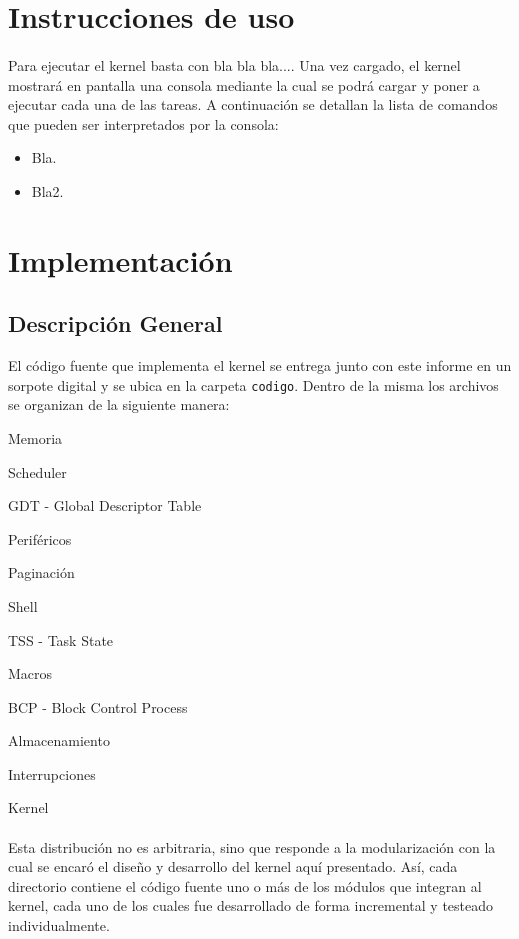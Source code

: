 \documentclass[11pt, a4paper]{article}
\begin{document}
		
\section{Instrucciones de uso}
\paragraph{}
Para ejecutar el kernel basta con bla bla bla.... Una vez cargado, el kernel mostrará en pantalla una consola mediante la cual se podrá cargar y poner a ejecutar cada una de las tareas. A continuación se detallan la lista de comandos que pueden ser interpretados por la consola:
\begin{itemize}
	\item Bla.
	\item Bla2.
\end{itemize}


\section{Implementación}
	\subsection{Descripción General}
	El código fuente que implementa el kernel se entrega junto con este informe en un sorpote digital y se ubica en la carpeta \texttt{codigo}. Dentro de la misma los archivos se organizan de la siguiente manera:
	\begin{center}
		\begin{shortitemize}
			\setlength{\shortitemwidth}{200pt}
			\item Memoria
			\item Scheduler
			\item GDT - Global Descriptor Table
			\item Periféricos
			\item Paginación				
			\item Shell
			\item TSS - Task State
			\item Macros
			\item BCP - Block Control Process
			\item Almacenamiento
			\item Interrupciones							
			\item Kernel
		\end{shortitemize}
	\end{center}		

	\paragraph{}
	Esta distribución no es arbitraria, sino que responde a la modularización con la cual se encaró el diseño y desarrollo del kernel aquí presentado. Así, cada directorio contiene el código fuente uno o más de los módulos que integran al kernel, cada uno de los cuales fue desarrollado de forma incremental y testeado individualmente.
	
\end{document}
